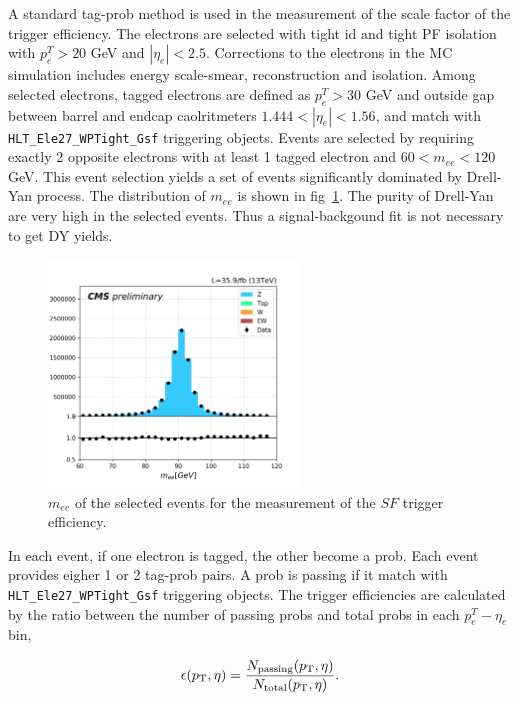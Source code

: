 A standard tag-prob method is used in the measurement of the scale factor of the trigger efficiency.
The electrons are selected with tight id and tight PF isolation with $p^T_e>20$ GeV and $|\eta_e|<2.5$. Corrections
to the electrons in the MC simulation includes energy scale-smear, reconstruction and isolation. 
Among selected electrons, tagged electrons
are defined as $p^T_e>30$ GeV and outside gap between barrel and endcap caolritmeters $1.444<|\eta_e|<1.56$, and 
match with \texttt{HLT\_Ele27\_WPTight\_Gsf} triggering objects. Events are selected by requiring exactly 2
opposite electrons with at least 1 tagged electron and $60<m_{ee}<120$ GeV. This event selection yields a set of events 
significantly dominated by Drell-Yan process. The distribution of $m_{ee}$ is shown in fig~\ref{fig:appendix:ele27TriggerSF}.
The purity of Drell-Yan are very high in the selected events. Thus a signal-backgound fit is not necessary to get DY yields.



\begin{figure}
    \centering
    \includegraphics[width=0.6\textwidth]{chapters/Appendix/sectionEleTrigger/figures/dileptonMass_tag30.png}
    \caption{$m_{ee}$ of the selected events for the measurement of the $SF$ trigger efficiency.}
    \label{fig:appendix:ele27TriggerSF}
\end{figure}

In each event, if one electron is tagged, the other become a prob. Each event provides eigher 1 or 2 tag-prob pairs.
A prob is passing if it match with \texttt{HLT\_Ele27\_WPTight\_Gsf} triggering objects.
The trigger efficiencies are calculated by the ratio between the number of passing probs and total probs in each $p^T_e-\eta_e$ bin, 

\begin{equation}
    \epsilon (p_{\mathrm{T}}, \eta) = \frac{ N_{\rm passing} (p_{\mathrm{T}}, \eta) } {  N_{\rm total} (p_{\mathrm{T}}, \eta) }.
\end{equation}

